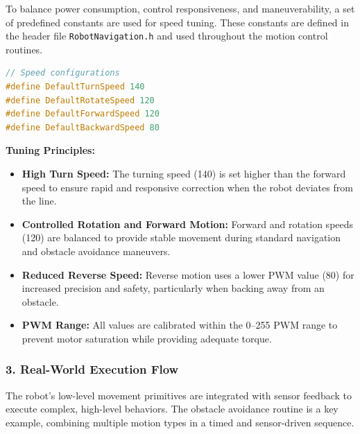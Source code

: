 \documentclass[conference]{IEEEtran}
\begin{document}
To balance power consumption, control responsiveness, and maneuverability, a set of predefined constants are used for speed tuning. These constants are defined in the header file \texttt{RobotNavigation.h} and used throughout the motion control routines.

\begin{lstlisting}[language=C++, caption=Speed tuning parameters]
// Speed configurations
#define DefaultTurnSpeed 140   
#define DefaultRotateSpeed 120 
#define DefaultForwardSpeed 120 
#define DefaultBackwardSpeed 80
\end{lstlisting}

\textbf{Tuning Principles:}
\begin{itemize}
    \item \textbf{High Turn Speed:} The turning speed (140) is set higher than the forward speed to ensure rapid and responsive correction when the robot deviates from the line.
    \item \textbf{Controlled Rotation and Forward Motion:} Forward and rotation speeds (120) are balanced to provide stable movement during standard navigation and obstacle avoidance maneuvers.
    \item \textbf{Reduced Reverse Speed:} Reverse motion uses a lower PWM value (80) for increased precision and safety, particularly when backing away from an obstacle.
    \item \textbf{PWM Range:} All values are calibrated within the 0--255 PWM range to prevent motor saturation while providing adequate torque.
\end{itemize}

\subsubsection*{\textbf{3. Real-World Execution Flow}}

The robot's low-level movement primitives are integrated with sensor feedback to execute complex, high-level behaviors. The obstacle avoidance routine is a key example, combining multiple motion types in a timed and sensor-driven sequence.
\end{document}
